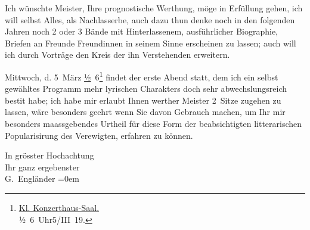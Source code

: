 \pstart
           Ich wünschte Meister, Ihre prognostische Werthung, möge in Erfüllung gehen, ich will
               selbst Alles, als Nachlasserbe, auch dazu thun {\kaufmannsund} denke
               noch in den folgenden Jahren noch 2 oder 3 {\pb}Bände mit
               Hinterlassenem, ausführlicher Biographie, Briefen an Freunde {\kaufmannsund} Freundinnen in seinem Sinne erscheinen zu lassen; auch
               will ich durch Vorträge den Kreis der ihn Verstehenden erweitern.\pend
           
\pstart
           Mittwoch, d. 5 März{ }\uline{½} 6\footnote{\noindent{}\uline{Kl. Konzerthaus-Saal.}{\\}½ 6 Uhr\hspace*{1em}5/III 19.} findet der erste Abend statt, dem ich ein selbst gewähltes Programm mehr
               lyrischen Charakters {\kaufmannsund} doch sehr abwechslungsreich
                  besti{\geminationm}t habe; ich habe mir erlaubt Ihnen werther
               Meister 2 Sitze zugehen zu lassen, wäre besonders geehrt wenn Sie davon Gebrauch
               machen, um Ihr mir besonders maassgebendes Urtheil für diese Form der beabsichtigten
               litterarischen Popularisirung des Verewigten, erfahren zu können.\pend
           
\pstart
           In grösster Hochachtung{\\[\baselineskip]}Ihr ganz ergebenster{\\[\baselineskip]}\spacefill\mbox{G. Engländer}\pend
           \leftskip=0em{}\endnumbering{}  \newcommand{\dateiname}{L02321}\newcommand{\titel}{Georg Engländer an Arthur Schnitzler, 27. 2. 1919}\newcommand{\editorInnen}{Martin Anton Müller und Gerd-Hermann Susen}
